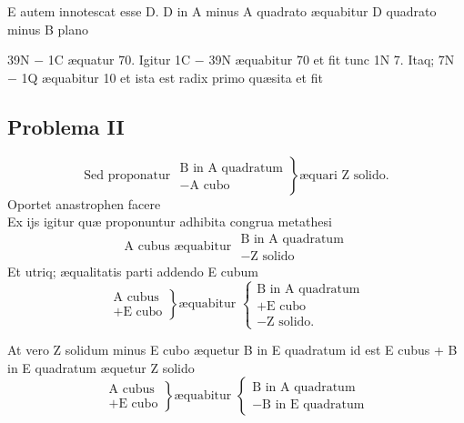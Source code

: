 \documentclass[11pt,a4paper]{article}
\begin{document}
E autem innotescat esse D. D in A minus A quadrato æquabitur D quadrato minus B plano

39N $-$ 1C æquatur 70. Igitur 1C $-$ 39N æquabitur 70 et fit tunc 1N 7. Itaq; 7N $-$ 1Q æquabitur 10 et ista est radix primo quæsita et fit 

\subsection*{Problema II}

\[ \text{Sed proponatur } \left.\begin{array}{l} \text{B in A quadratum} \\ -\text{A cubo} \end{array}\right\} \text{æquari Z solido.} \]
Oportet anastrophen facere\\
Ex ijs igitur quæ proponuntur adhibita congrua metathesi
\[ \text{A cubus æquabitur } \begin{array}{l} \text{B in A quadratum} \\ -\text{Z solido} \end{array} \]
Et utriq; æqualitatis parti addendo E cubum
\[ \left.\begin{array}{l} \text{A cubus} \\ +\text{E cubo} \end{array}\right\} \text{æquabitur } \left\{\begin{array}{l} \text{B in A quadratum} \\ +\text{E cubo} \\ -\text{Z solido.} \end{array}\right. \]

At vero Z solidum minus E cubo æquetur B in E quadratum id est E cubus + B in E quadratum æquetur Z solido\marginal{\struck{\ill{}}}
\[ \left.\begin{array}{l} \text{A cubus} \\ +\text{E cubo} \end{array}\right\} \text{æquabitur } \left\{\begin{array}{l} \text{B in A quadratum} \\ -\text{B in E quadratum} \end{array}\right. \]
\end{document}

